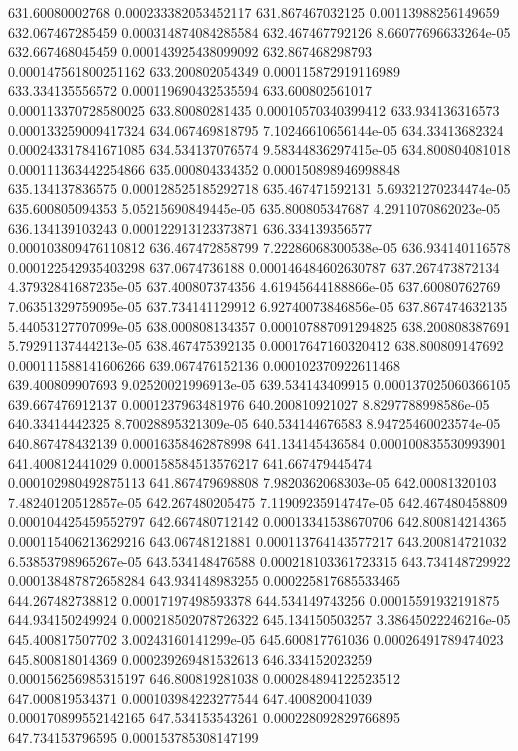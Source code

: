 {631.60080002768 0.000233382053452117
631.867467032125 0.00113988256149659
632.067467285459 0.000314874084285584
632.467467792126 8.66077696633264e-05
632.667468045459 0.000143925438099092
632.867468298793 0.000147561800251162
633.200802054349 0.000115872919116989
633.334135556572 0.000119690432535594
633.600802561017 0.000113370728580025
633.80080281435 0.00010570340399412
633.934136316573 0.000133259009417324
634.067469818795 7.10246610656144e-05
634.33413682324 0.000243317841671085
634.534137076574 9.58344836297415e-05
634.800804081018 0.000111363442254866
635.000804334352 0.000150898946998848
635.134137836575 0.000128525185292718
635.467471592131 5.69321270234474e-05
635.600805094353 5.05215690849445e-05
635.800805347687 4.2911070862023e-05
636.134139103243 0.000122913123373871
636.334139356577 0.000103809476110812
636.467472858799 7.22286068300538e-05
636.934140116578 0.000122542935403298
637.0674736188 0.000146484602630787
637.267473872134 4.37932841687235e-05
637.400807374356 4.61945644188866e-05
637.60080762769 7.06351329759095e-05
637.734141129912 6.92740073846856e-05
637.867474632135 5.44053127707099e-05
638.000808134357 0.000107887091294825
638.200808387691 5.79291137444213e-05
638.467475392135 0.00017647160320412
638.800809147692 0.000111588141606266
639.067476152136 0.000102370922611468
639.400809907693 9.02520021996913e-05
639.534143409915 0.000137025060366105
639.667476912137 0.0001237963481976
640.200810921027 8.8297788998586e-05
640.33414442325 8.70028895321309e-05
640.534144676583 8.94725460023574e-05
640.867478432139 0.00016358462878998
641.134145436584 0.000100835530993901
641.400812441029 0.000158584513576217
641.667479445474 0.000102980492875113
641.867479698808 7.9820362068303e-05
642.00081320103 7.48240120512857e-05
642.267480205475 7.11909235914747e-05
642.467480458809 0.000104425459552797
642.667480712142 0.00013341538670706
642.800814214365 0.000115406213629216
643.06748121881 0.000113764143577217
643.200814721032 6.53853798965267e-05
643.534148476588 0.000218103361723315
643.734148729922 0.000138487872658284
643.934148983255 0.000225817685533465
644.267482738812 0.00017197498593378
644.534149743256 0.00015591932191875
644.934150249924 0.000218502078726322
645.134150503257 3.38645022246216e-05
645.400817507702 3.00243160141299e-05
645.600817761036 0.00026491789474023
645.800818014369 0.000239269481532613
646.334152023259 0.000156256985315197
646.800819281038 0.000284894122523512
647.000819534371 0.000103984223277544
647.400820041039 0.000170899552142165
647.534153543261 0.000228092829766895
647.734153796595 0.000153785308147199
}
